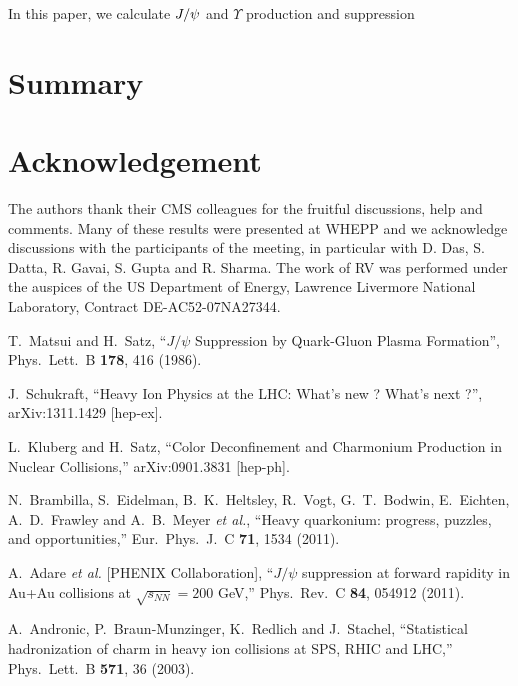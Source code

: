 \documentclass[aps,prc,preprint,superscriptaddress,showpacs,showkeys]{revtex4-1}
\begin{document}
In this paper, we calculate $J/\psi$ and $\Upsilon$ production and
suppression 


\section{Summary}
 
 
 \section{Acknowledgement}
  The authors thank their CMS colleagues for the fruitful discussions, 
help and comments. Many of these results were presented at WHEPP and we acknowledge discussions 
with the participants of the meeting, in particular with D. Das, S. Datta, R. Gavai, S. Gupta
and R. Sharma. The work of RV was performed under the auspices of the US Department of Energy, 
Lawrence Livermore National Laboratory, Contract DE-AC52-07NA27344.


\noindent
\begin{thebibliography}{100}
\medskip

 T.~Matsui and H.~Satz,
 ``$J/\psi$ Suppression by Quark-Gluon Plasma Formation'',
 Phys.\ Lett.\ B {\bf 178}, 416 (1986).

  J.~Schukraft,
  ``Heavy Ion Physics at the LHC: What's new ? What's next ?'',
  arXiv:1311.1429 [hep-ex].


  L.~Kluberg and H.~Satz,
  ``Color Deconfinement and Charmonium Production in Nuclear Collisions,''
  arXiv:0901.3831 [hep-ph].

  N.~Brambilla, S.~Eidelman, B.~K.~Heltsley, R.~Vogt, G.~T.~Bodwin, E.~Eichten, A.~D.~Frawley and A.~B.~Meyer {\it et al.},
  ``Heavy quarkonium: progress, puzzles, and opportunities,''
  Eur.\ Phys.\ J.\ C {\bf 71}, 1534 (2011).

  A.~Adare {\it et al.}  [PHENIX Collaboration],
  ``$J/\psi$ suppression at forward rapidity in Au+Au collisions at $\sqrt{s_{NN}}=200$ GeV,''
  Phys.\ Rev.\ C {\bf 84}, 054912 (2011).

  A.~Andronic, P.~Braun-Munzinger, K.~Redlich and J.~Stachel,
  ``Statistical hadronization of charm in heavy ion collisions at SPS, RHIC and LHC,''
  Phys.\ Lett.\ B {\bf 571}, 36 (2003).


  

\end{thebibliography}
\end{document}
